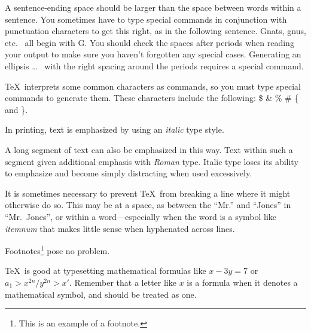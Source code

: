 A sentence-ending space should be larger than the space between words
within a sentence.  You sometimes have to type special commands in
conjunction with punctuation characters to get this right, as in the
following sentence.
       Gnats, gnus, etc.\    %
       all begin with G\@.   %
You should check the spaces after periods when reading your output to
make sure you haven't forgotten any special cases.
Generating an ellipsis 
       \ldots\    %
with the right spacing around the periods 
requires a special  command.  

\TeX\ interprets some common characters as commands, so you must type
special commands to generate them.  These characters include the
following: 
       \$ \& \% \# \{ and \}.

In printing, text is emphasized by using an
       {\em italic\/}  %
type style.  

\begin{em}
   A long segment of text can also be emphasized in this way.  Text within
   such a segment given additional emphasis 
          with\/ {\em Roman} 
   type.  Italic type loses its ability to emphasize and become simply
   distracting when used excessively.  
\end{em}

It is sometimes necessary to prevent \TeX\ from breaking a line where
it might otherwise do so.  This may be at a space, as between the
``Mr.'' and ``Jones'' in
       ``Mr.~Jones'',        %
or within a word---especially when the word is a symbol like
       \mbox{\em itemnum\/} 
that makes little sense when hyphenated across 
       lines.

Footnotes\footnote{This is an example of a footnote.}
pose no problem.

\TeX\ is good at typesetting mathematical formulas like
       \( x-3y = 7 \) 
or
       \( a_{1} > x^{2n} / y^{2n} > x' \).
Remember that a letter like
       $x$        %
is a formula when it denotes a mathematical symbol, and should
be treated as one.

